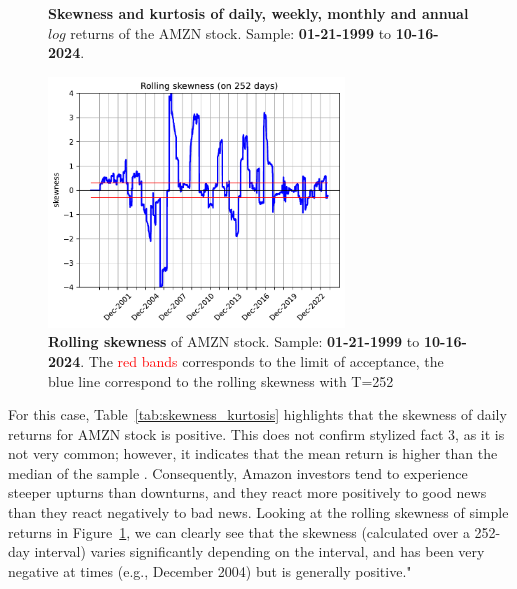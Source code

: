 \documentclass{article}
\begin{document}
\begin{figure}[H]
    \centering
    \begin{minipage}{0.45\textwidth}
        \begin{table}[H]
            \centering
              
            \caption{\textbf{Skewness and kurtosis of daily, weekly, monthly and annual} $log$ returns of the AMZN stock. 
            Sample: \textbf{01-21-1999} to \textbf{10-16-2024}.}
            \label{tab:skewness_kurtosis}
        \end{table}
    \end{minipage}
    \hspace{0.05\textwidth}
    \begin{minipage}{0.45\textwidth}
        \centering
        \includegraphics[width=0.7\textwidth]{Img/Fact3_2_rollskew.pdf}
        \caption{\textbf{Rolling skewness} of AMZN stock. 
        Sample: \textbf{01-21-1999} to \textbf{10-16-2024}. The \textcolor{red}{red bands} corresponds to the limit of acceptance, the blue line correspond to the rolling skewness with T=252}
        \label{fig:Rolling_skewness}
    \end{minipage}
\end{figure}

\noindent For this case, Table~\ref{tab:skewness_kurtosis} highlights that the skewness of daily returns for AMZN stock is positive.
This does not confirm stylized fact 3, as it is not very common; however, it indicates that the mean return is higher than the median of the sample \cite{albuquerque2012skewness}. 
Consequently, Amazon investors tend to experience steeper upturns than downturns, and they react more positively to good news than they react negatively to bad news.
Looking at the rolling skewness of simple returns in Figure~\ref{fig:Rolling_skewness}, we can clearly see that the skewness (calculated over a 252-day interval) 
varies significantly depending on the interval, and has been very negative at times (e.g., December 2004) but is generally positive."
\end{document}
